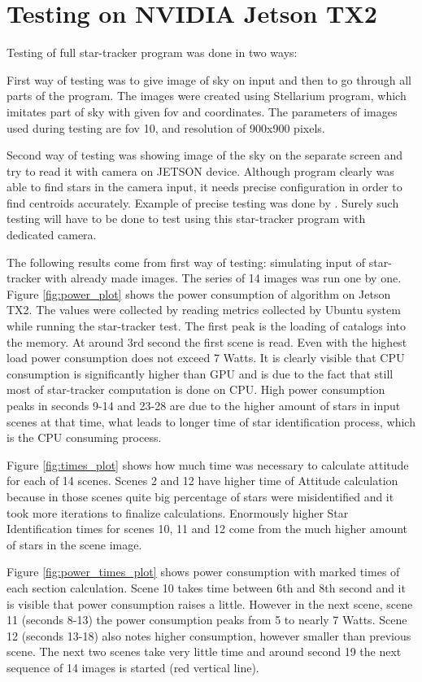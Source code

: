 \documentclass[12pt,a4paper,twoside]{article}
\begin{document}
\newpage
\section{Testing on NVIDIA Jetson TX2}

Testing of full star-tracker program was done in two ways:

First way of testing was to give image of sky on input and then to go through all parts of the program. The images were created using Stellarium program, which imitates part of sky with given \gls{fov} and coordinates. The parameters of images used during testing are \gls{fov} 10\degree , and resolution of 900x900 pixels.

Second way of testing was showing image of the sky on the separate screen and try to read it with camera on JETSON device. Although program clearly was able to find stars in the camera input, it needs precise configuration in order to find centroids accurately. Example of precise testing was done by \citet{tappe2011star}. Surely such testing will have to be done to test using this star-tracker program with dedicated camera.

The following results come from first way of testing: simulating input of star-tracker with already made images. The series of 14 images was run one by one. Figure \ref{fig:power_plot} shows the power consumption of algorithm on Jetson TX2. The values were collected by reading metrics collected by Ubuntu system while running the star-tracker test. The first peak is the loading of catalogs into the memory. At around 3rd second the first scene is read. Even with the highest load power consumption does not exceed 7 Watts. It is clearly visible that CPU consumption is significantly higher than GPU and is due to the fact that still most of star-tracker computation is done on CPU. High power consumption peaks in seconds 9-14 and 23-28 are due to the higher amount of stars in input scenes at that time, what leads to longer time of star identification process, which is the CPU consuming process.

Figure \ref{fig:times_plot} shows how much time was necessary to calculate attitude for each of 14 scenes. Scenes 2 and 12 have higher time of Attitude calculation because in those scenes quite big percentage of stars were misidentified and it took more iterations to finalize calculations. Enormously higher Star Identification times for scenes 10, 11 and 12 come from the much higher amount of stars in the scene image. 

Figure \ref{fig:power_times_plot} shows power consumption with marked times of each section calculation. Scene 10 takes time between 6th and 8th second and it is visible that power consumption raises a little. However in the next scene, scene 11 (seconds 8-13) the power consumption peaks from 5 to nearly 7 Watts. Scene 12 (seconds 13-18) also notes higher consumption, however smaller than previous scene. The next two scenes take very little time and around second 19 the next sequence of 14 images is started (red vertical line).
\end{document}
